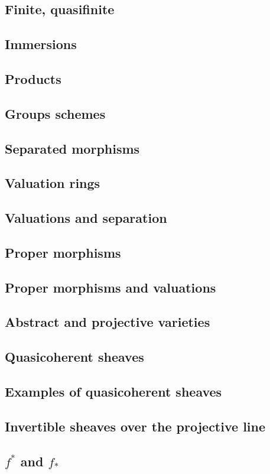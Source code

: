 \documentclass [11 pt, oneside, margin = 1 in] {article}
\begin{document}
\subsection{Finite, quasifinite}
\subsection{Immersions}
\subsection{Products}
\subsection{Groups schemes}
\subsection{Separated morphisms}
\subsection{Valuation rings}
\subsection{Valuations and separation}
\subsection{Proper morphisms}
\subsection{Proper morphisms and valuations}
\subsection{Abstract and projective varieties}
\subsection{Quasicoherent sheaves}
\subsection{Examples of quasicoherent sheaves}
\subsection{Invertible sheaves over the projective line}
\subsection{$f^*$ and $f_*$}
\end{document}
